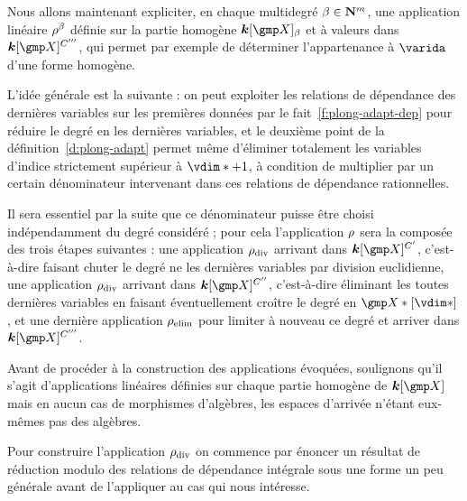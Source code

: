 Nous allons maintenant expliciter, en chaque multidegré \( \beta \in {\mathbf{N}}^m
\), une application linéaire \( \rho^\beta \) définie sur la partie homogène
\( \cdn[ \vmp ]_\beta \) et à valeurs dans \( \cdn[ \vmp ]^{C'''} \), qui
permet par exemple de déterminer l'appartenance à \( \varida \) d'une forme
homogène.

L'idée générale est la suivante : on peut exploiter les relations de
dépendance des dernières variables sur les premières données par le
fait~\ref{f:plong-adapt-dep} pour réduire le degré en les dernières variables,
et le deuxième point de la définition~\ref{d:plong-adapt} permet même
d'éliminer totalement les variables d'indice strictement supérieur à \( \vdim*
  + 1 \), à condition de multiplier par un certain dénominateur intervenant
dans ces relations de dépendance rationnelles.

Il sera essentiel par la suite que ce dénominateur puisse être choisi
indépendamment du degré considéré ; pour cela l'application \( \rho \)
sera la composée des trois étapes suivantes : une application \( \rho\sb{\mathrm{div }} \)
arrivant dans \( \cdn[ \vmp ]^{C'} \), c'est-à-dire faisant chuter le degré ne
les dernières variables par division euclidienne, une application \( \rho\sb{\mathrm{div }} \)
arrivant dans \( \cdn[ \vmp ]^{C''} \), c'est-à-dire éliminant
les toutes dernières variables en faisant éventuellement croître le degré en
\( \vmp*[\vdim*] \), et une dernière application \( \rho\sb{\mathrm{elim}} \) pour limiter à
nouveau ce degré et arriver dans \( \cdn[ \vmp ]^{C'''} \).

Avant de procéder à la construction des applications évoquées, soulignons
qu'il s'agit d'applications linéaires définies sur chaque partie homogène de
\( \cdn[ \vmp ] \) mais en aucun cas de morphismes d'algèbres, les espaces
d'arrivée n'étant eux-mêmes pas des algèbres.

Pour construire l'application \( \rho\sb{\mathrm{div }} \) on commence par énoncer un résultat
de réduction modulo des relations de dépendance intégrale sous une forme un
peu générale avant de l'appliquer au cas qui nous intéresse.

